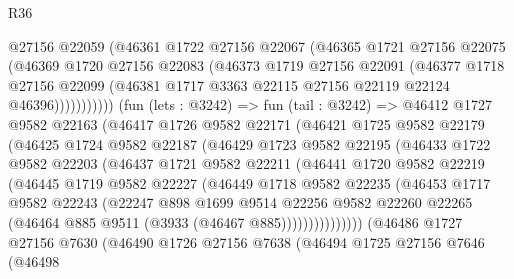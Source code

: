 \begin{lexlean}{R36}
\begin{coremodule}
                  @27156
                  @22059
                  (@46361
                    @1722
                    @27156
                    @22067
                    (@46365
                      @1721
                      @27156
                      @22075
                      (@46369
                        @1720
                        @27156
                        @22083
                        (@46373
                          @1719
                          @27156
                          @22091
                          (@46377
                            @1718
                            @27156
                            @22099
                            (@46381 @1717 @3363 @22115 @27156 @22119 @22124 @46396)))))))))))
        (fun (lets : @3242) =>
        fun (tail : @3242) =>
        @46412
          @1727
          @9582
          @22163
          (@46417
            @1726
            @9582
            @22171
            (@46421
              @1725
              @9582
              @22179
              (@46425
                @1724
                @9582
                @22187
                (@46429
                  @1723
                  @9582
                  @22195
                  (@46433
                    @1722
                    @9582
                    @22203
                    (@46437
                      @1721
                      @9582
                      @22211
                      (@46441
                        @1720
                        @9582
                        @22219
                        (@46445
                          @1719
                          @9582
                          @22227
                          (@46449
                            @1718
                            @9582
                            @22235
                            (@46453
                              @1717
                              @9582
                              @22243
                              (@22247
                                @898
                                @1699
                                @9514
                                @22256
                                @9582
                                @22260
                                @22265
                                (@46464 @885 @9511 (@3933 (@46467 @885)))))))))))))))
        (@46486
          @1727
          @27156
          @7630
          (@46490
            @1726
            @27156
            @7638
            (@46494
              @1725
              @27156
              @7646
              (@46498

\end{coremodule}
\end{lexlean}
